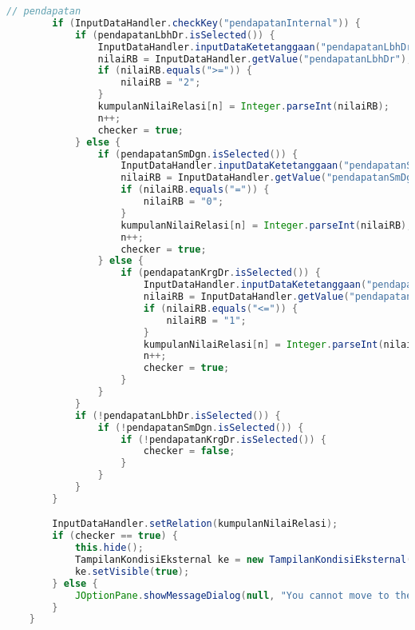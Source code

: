 \begin{lstlisting}[language=Java, caption=TampilanKondisiKetetanggaan.java]
        // pendapatan
        if (InputDataHandler.checkKey("pendapatanInternal")) {
            if (pendapatanLbhDr.isSelected()) {
                InputDataHandler.inputDataKetetanggaan("pendapatanLbhDr", pendapatanLbhDr.getText());
                nilaiRB = InputDataHandler.getValue("pendapatanLbhDr");
                if (nilaiRB.equals(">=")) {
                    nilaiRB = "2";
                }
                kumpulanNilaiRelasi[n] = Integer.parseInt(nilaiRB);
                n++;
                checker = true;
            } else {
                if (pendapatanSmDgn.isSelected()) {
                    InputDataHandler.inputDataKetetanggaan("pendapatanSmDgn", pendapatanSmDgn.getText());
                    nilaiRB = InputDataHandler.getValue("pendapatanSmDgn");
                    if (nilaiRB.equals("=")) {
                        nilaiRB = "0";
                    }
                    kumpulanNilaiRelasi[n] = Integer.parseInt(nilaiRB);
                    n++;
                    checker = true;
                } else {
                    if (pendapatanKrgDr.isSelected()) {
                        InputDataHandler.inputDataKetetanggaan("pendapatanKurangDari", pendapatanKrgDr.getText());
                        nilaiRB = InputDataHandler.getValue("pendapatanKurangDari");
                        if (nilaiRB.equals("<=")) {
                            nilaiRB = "1";
                        }
                        kumpulanNilaiRelasi[n] = Integer.parseInt(nilaiRB);
                        n++;
                        checker = true;
                    }
                }
            }
            if (!pendapatanLbhDr.isSelected()) {
                if (!pendapatanSmDgn.isSelected()) {
                    if (!pendapatanKrgDr.isSelected()) {
                        checker = false;
                    }
                }
            }
        }

        InputDataHandler.setRelation(kumpulanNilaiRelasi);
        if (checker == true) {
            this.hide();
            TampilanKondisiEksternal ke = new TampilanKondisiEksternal();
            ke.setVisible(true);
        } else {
            JOptionPane.showMessageDialog(null, "You cannot move to the other page because you must fill radio button first!");
        }
    }                                       


\end{lstlisting}

